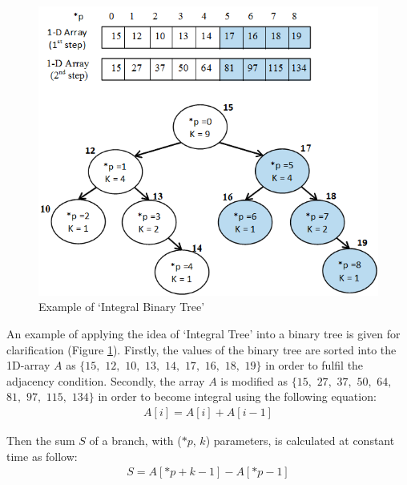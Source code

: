 \documentclass{subfiles}
\begin{document}
\begin{figure}[!htbp]
	\centering
	\includegraphics[width=4.8in]{img/IntegralBinaryTree}
	\caption{Example of `Integral Binary Tree'}
	\label{fig:IntegralBinaryTree}
\end{figure}

\par  An example of applying the idea of `Integral Tree' into a binary tree is given for clarification (Figure \ref{fig:IntegralBinaryTree}). Firstly, the values of the binary tree are sorted into the 1D-array $A$ as $\{15,$ $12,$ $10,$ $13,$ $14,$ $17,$ $16,$ $18,$ $19\}$ in order to fulfil the adjacency condition. Secondly, the array $A$ is modified as $\{15,$ $27,$ $37,$ $50,$ $64,$ $81,$ $97,$ $115,$ $134\}$ in order to become integral using the following equation:
\begin{equation}
\begin{split}
A[i]=A[i]+A[i-1]
\end{split}
\end{equation}


\par Then the sum $S$ of a branch, with ($*p$, $k$) parameters,  is calculated at constant time as follow:
\begin{equation}
\begin{split}
S = A[*p+k-1]-A[*p-1]
\end{split}
\end{equation}
\end{document}
